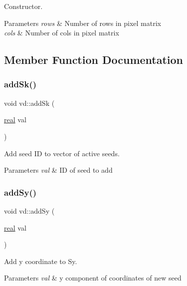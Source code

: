 Constructor. 


\begin{DoxyParams}{Parameters}
{\em rows} & Number of rows in pixel matrix \\
\hline
{\em cols} & Number of cols in pixel matrix \\
\hline
\end{DoxyParams}


\subsection{Member Function Documentation}
\mbox{\label{classvd_a62112357c953c7dc77a4e3fb46aeaf9d}} 
\subsubsection{\texorpdfstring{add\+Sk()}{addSk()}}
{\footnotesize\ttfamily void vd\+::add\+Sk (\begin{DoxyParamCaption}\item[{\mbox{\hyperlink{typedefs_8h_a58a0c7cf2501f4492da833421be92547}{real}}}]{val }\end{DoxyParamCaption})}



Add seed ID to vector of active seeds. 


\begin{DoxyParams}{Parameters}
{\em val} & ID of seed to add \\
\hline
\end{DoxyParams}
\mbox{\label{classvd_ae15b2741f063cc113aaf7a23199a5efe}} 
\subsubsection{\texorpdfstring{add\+Sy()}{addSy()}}
{\footnotesize\ttfamily void vd\+::add\+Sy (\begin{DoxyParamCaption}\item[{\mbox{\hyperlink{typedefs_8h_a58a0c7cf2501f4492da833421be92547}{real}}}]{val }\end{DoxyParamCaption})}



Add y coordinate to Sy. 


\begin{DoxyParams}{Parameters}
{\em val} & y component of coordinates of new seed \\
\hline
\end{DoxyParams}
\mbox{\label{classvd_a0542124682b77128935d62210a9c86fe}} 
